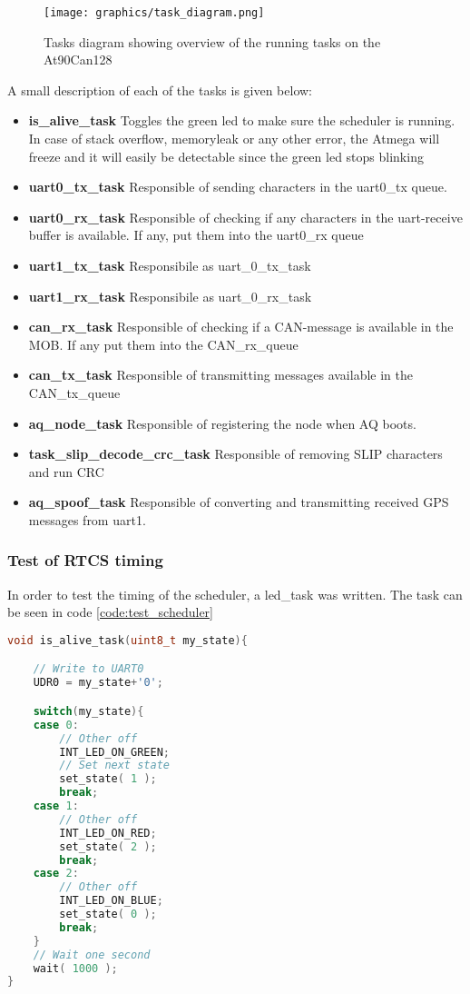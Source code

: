 \begin{figure}[H]
    \center
    \texttt{[image: graphics/task\_diagram.png]}
  \caption{Tasks diagram showing overview of the running tasks on the At90Can128}
    \label{fig:task_diagram_atmega}
\end{figure}
A small description of each of the tasks is given below:
\begin{itemize}
\item \textbf{ is\_alive\_task} Toggles the green led to make sure the scheduler is running. In case of stack overflow, memoryleak or any other error, the Atmega will freeze and it will easily be detectable since the green led stops blinking
\item \textbf{ uart0\_tx\_task} Responsible of sending characters in the uart0\_tx queue.
\item \textbf{ uart0\_rx\_task} Responsible of checking if any characters in the uart-receive buffer is available. If any, put them into the uart0\_rx queue
\item \textbf{ uart1\_tx\_task} Responsibile as uart\_0\_tx\_task
\item \textbf{ uart1\_rx\_task} Responsibile as uart\_0\_rx\_task
\item \textbf{ can\_rx\_task} Responsible of checking if a CAN-message is available in the MOB. If any put them into the CAN\_rx\_queue
\item \textbf{ can\_tx\_task} Responsible of transmitting messages available in the CAN\_tx\_queue
\item \textbf{ aq\_node\_task} Responsible of registering the node when AQ boots.
\item \textbf{ task\_slip\_decode\_crc\_task} Responsible of removing SLIP characters and run CRC
\item \textbf{ aq\_spoof\_task} Responsible of converting and transmitting received GPS messages from uart1.
\end{itemize}

\subsubsection*{Test of RTCS timing}
In order to test the timing of the scheduler, a led\_task was written. The task can be seen in code \ref{code:test_scheduler}
\begin{lstlisting}[language = c, caption = RTCS task used in timing test, label=code:test_scheduler]
void is_alive_task(uint8_t my_state){

	// Write to UART0
	UDR0 = my_state+'0';

	switch(my_state){
	case 0:
		// Other off
		INT_LED_ON_GREEN;	
		// Set next state
	    set_state( 1 );
		break;
	case 1:
		// Other off
		INT_LED_ON_RED;
	    set_state( 2 );
		break;
	case 2:
		// Other off
		INT_LED_ON_BLUE;
	    set_state( 0 );
		break;
	}
	// Wait one second
	wait( 1000 );
}
\end{lstlisting}

